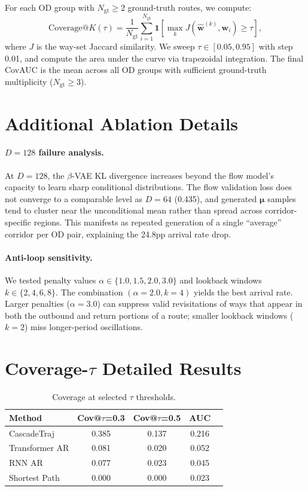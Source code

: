 For each OD group with $N_{\mathrm{gt}} \geq 2$ ground-truth routes, we compute:
\begin{equation}
  \mathrm{Coverage}@K(\tau) = \frac{1}{N_{\mathrm{gt}}} \sum_{i=1}^{N_{\mathrm{gt}}} \mathbf{1}\!\left[\max_{k} J(\hat{\mathbf{w}}^{(k)}, \mathbf{w}_i) \geq \tau\right],
\end{equation}
where $J$ is the way-set Jaccard similarity.
We sweep $\tau \in [0.05, 0.95]$ with step 0.01, and compute the area under the curve via trapezoidal integration.
The final CovAUC is the mean across all OD groups with sufficient ground-truth multiplicity ($N_{\mathrm{gt}} \geq 3$).

\section{Additional Ablation Details}
\label{app:ablation}

\paragraph{$D = 128$ failure analysis.}
At $D = 128$, the $\beta$-VAE KL divergence increases beyond the flow model's capacity to learn sharp conditional distributions.
The flow validation loss does not converge to a comparable level as $D = 64$ (0.435), and generated $\boldsymbol{\mu}$ samples tend to cluster near the unconditional mean rather than spread across corridor-specific regions.
This manifests as repeated generation of a single ``average'' corridor per OD pair, explaining the 24.8pp arrival rate drop.

\paragraph{Anti-loop sensitivity.}
We tested penalty values $\alpha \in \{1.0, 1.5, 2.0, 3.0\}$ and lookback windows $k \in \{2, 4, 6, 8\}$.
The combination $(\alpha = 2.0, k = 4)$ yields the best arrival rate.
Larger penalties ($\alpha = 3.0$) can suppress valid revisitations of ways that appear in both the outbound and return portions of a route; smaller lookback windows ($k = 2$) miss longer-period oscillations.

\section{Coverage-$\tau$ Detailed Results}
\label{app:cov-detail}

\begin{table}[h]
  \caption{Coverage at selected $\tau$ thresholds.}
  \label{tab:cov-detail}
  \centering
  \small
  \begin{tabular}{lcccc}
    \toprule
    Method & Cov@$\tau$=0.3 & Cov@$\tau$=0.5 & AUC \\
    \midrule
    CascadeTraj    & 0.385 & 0.137 & 0.216 \\
    Transformer AR & 0.081 & 0.020 & 0.052 \\
    RNN AR         & 0.077 & 0.023 & 0.045 \\
    Shortest Path  & 0.000 & 0.000 & 0.023 \\
    \bottomrule
  \end{tabular}
\end{table}
